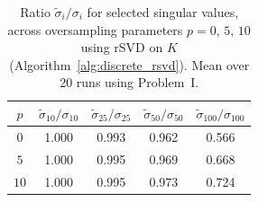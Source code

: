 \begin{table}[ht]
    \centering
    \begin{tabular}{c cccc}
    \toprule
    $p$
    & $\tilde \sigma_{10}  / \sigma_{10}$
    & $\tilde \sigma_{25}  / \sigma_{25}$
    & $\tilde \sigma_{50}  / \sigma_{50}$
    & $\tilde \sigma_{100} / \sigma_{100}$ \\
    \midrule
    $0$ & 1.000 & 0.993 & 0.962 & 0.566 \\
    
    \midrule
    $5$ & 1.000 & 0.995 & 0.969 & 0.668 \\

    \midrule
    $10$ & 1.000 & 0.995 & 0.973 & 0.724 \\
    \bottomrule
    \end{tabular}

    \caption{Ratio $\tilde \sigma_i / \sigma_i$ for selected singular values, across oversampling parameters $p=0,\,5,\,10$ using rSVD on $K$ (Algorithm~\ref{alg:discrete_rsvd}). Mean over 20 runs using Problem~I.}
    \label{tab:singular_values_comparison}
\end{table}